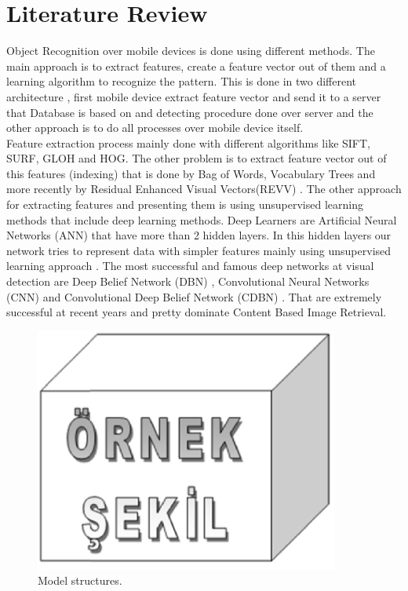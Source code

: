 \section{Literature Review}\label{literaturereview}
Object Recognition over mobile devices is done using different methods. The main approach is to extract features, create a feature vector out of them and a learning algorithm to recognize the pattern. This is done in two different architecture \cite{residual_enhanced_visual_vector}, first mobile device extract feature vector and send it to a server that Database is based on and detecting procedure done over server and the other approach is to do all processes over mobile device itself. \\
Feature extraction process mainly done with different algorithms like SIFT\cite{SIFT}, SURF\cite{SURF}, GLOH\cite{GLOH} and HOG\cite{HOG}. The other problem is to extract feature vector out of this features (indexing) that is done by Bag of Words\cite{BoW}, Vocabulary Trees \cite{vocabulary_tree} and more recently by Residual Enhanced Visual Vectors(REVV) \cite{residual_enhanced_visual_vector}. The other approach for extracting features and presenting them is using unsupervised learning methods that include deep learning methods. Deep Learners are Artificial Neural Networks (ANN) that have more than 2 hidden layers. In this hidden layers our network tries to represent data with simpler features mainly using unsupervised learning approach \cite{DBN}. The most successful and famous deep networks at visual detection are Deep Belief Network (DBN) \cite{DBN}, Convolutional Neural Networks (CNN) \cite{CNN} and Convolutional Deep Belief Network (CDBN) \cite{CDBN}. That are extremely successful at recent years and pretty dominate Content Based Image Retrieval.
\begin{figure}
 \centering
 \includegraphics[width=10cm,keepaspectratio=true]{./fig/sekil1}
 \caption{Model structures.}
\end{figure}

